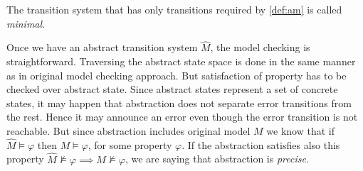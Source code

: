 \noindent
The transition system that has only transitions required by \autoref{def:am} is called
\emph{minimal}.

Once we have an abstract transition system $\widehat{M}$, the model checking is
straightforward. Traversing the abstract state space is done in the same manner as
in original model checking approach. But satisfaction of property has to be checked
over abstract state. Since abstract states represent a set of concrete states,
it may happen that abstraction does not separate error transitions from the rest.
Hence it may announce an error even though the error transition is not reachable.
But since abstraction includes original model $M$ we know that if $\widehat{M} \models \varphi$
then $M \models \varphi$, for some property $\varphi$. If the abstraction satisfies
also this property $\widehat{M} \not\models \varphi \implies M \not\models \varphi$,
we are saying that abstraction is \emph{precise}.

